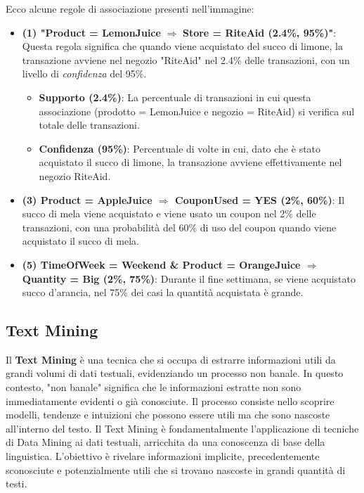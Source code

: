 \documentclass{report}
\begin{document}
	Ecco alcune regole di associazione presenti nell'immagine:
	\begin{itemize}
    	\item \textbf{(1) "Product = LemonJuice} $\Rightarrow$ \textbf{Store = RiteAid (2.4\%, 95\%)"}: Questa regola significa che quando viene acquistato del succo di limone, la transazione avviene nel negozio "RiteAid" nel 2.4\% delle transazioni, con un livello di \textit{confidenza} del 95\%.
    	\begin{itemize}
        	\item \textbf{Supporto (2.4\%)}: La percentuale di transazioni in cui questa associazione (prodotto = LemonJuice e negozio = RiteAid) si verifica sul totale delle transazioni.
        	\item \textbf{Confidenza (95\%)}: Percentuale di volte in cui, dato che è stato acquistato il succo di limone, la transazione avviene effettivamente nel negozio RiteAid.
    	\end{itemize}
		\item \textbf{(3) Product = AppleJuice $\Rightarrow$ CouponUsed = YES (2\%, 60\%)}: Il succo di mela viene acquistato e viene usato un coupon nel 2\% delle transazioni, con una probabilità del 60\% di uso del coupon quando viene acquistato il succo di mela.
		\item \textbf{(5) TimeOfWeek = Weekend \& Product = OrangeJuice $\Rightarrow$ Quantity = Big (2\%, 75\%)}: Durante il fine settimana, se viene acquistato succo d'arancia, nel 75\% dei casi la quantità acquistata è grande.
	\end{itemize}

	\subsection{Text Mining}
	Il \textbf{Text Mining} è una tecnica che si occupa di  estrarre informazioni utili da grandi volumi di dati testuali, evidenziando un processo non banale. In questo contesto, "non banale" significa che le informazioni estratte non sono immediatamente evidenti o già conosciute. Il processo consiste nello scoprire modelli, tendenze e intuizioni che possono essere utili ma che sono nascoste all'interno del testo. Il Text Mining è fondamentalmente l'applicazione di tecniche di Data Mining ai dati testuali, arricchita da una conoscenza di base della linguistica. L'obiettivo è rivelare informazioni implicite, precedentemente sconosciute e potenzialmente utili che si trovano nascoste in grandi quantità di testi.
\end{document}

